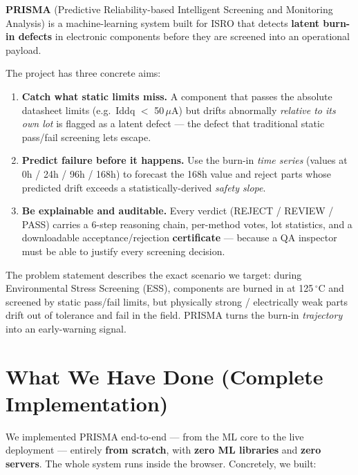 \documentclass[11pt,a4paper]{article}
\newcommand{\answerbox}[2]{\par\vspace{0.8em}\noindent
  \begin{tcolorbox}[colback=isroblue!6,colframe=isroblue,
    title={\sffamily\bfseries\color{white}#1},arc=2pt,boxrule=1.2pt]
    #2
  \end{tcolorbox}\par\vspace{0.4em}}
\begin{document}
\answerbox{What is PRISMA trying to achieve?}{
  \textbf{PRISMA} (Predictive Reliability-based Intelligent Screening and Monitoring Analysis) is a
  machine-learning system built for ISRO that detects \textbf{latent burn-in defects} in electronic
  components before they are screened into an operational payload.

  The project has three concrete aims:
  \begin{enumerate}[leftmargin=1.5em]
    \item \textbf{Catch what static limits miss.} A component that passes the absolute datasheet
          limits (e.g.\ Iddq $<$ 50\,$\mu$A) but drifts abnormally \emph{relative to its own lot}
          is flagged as a latent defect --- the defect that traditional static pass/fail screening
          lets escape.
    \item \textbf{Predict failure before it happens.} Use the burn-in \emph{time series}
          (values at 0h / 24h / 96h / 168h) to forecast the 168h value and reject parts whose
          predicted drift exceeds a statistically-derived \emph{safety slope}.
    \item \textbf{Be explainable and auditable.} Every verdict (REJECT / REVIEW / PASS) carries a
          6-step reasoning chain, per-method votes, lot statistics, and a downloadable
          acceptance/rejection \textbf{certificate} --- because a QA inspector must be able to
          justify every screening decision.
  \end{enumerate}
}

\noindent The problem statement describes the exact scenario we target: during Environmental Stress
Screening (ESS), components are burned in at 125\,$^{\circ}$C and screened by static pass/fail
limits, but physically strong / electrically weak parts drift out of tolerance and fail in the
field. PRISMA turns the burn-in \emph{trajectory} into an early-warning signal.

\section{What We Have Done (Complete Implementation)}

\answerbox{The full scope of the delivered system}{
  We implemented PRISMA end-to-end --- from the ML core to the live deployment --- entirely
  \textbf{from scratch}, with \textbf{zero ML libraries} and \textbf{zero servers}. The whole system
  runs inside the browser. Concretely, we built:
}
\end{document}
